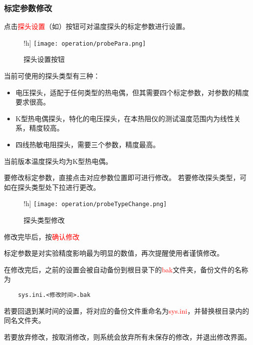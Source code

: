 \subsubsection*{标定参数修改}
点击\textcolor{red}{探头设置}（如）按钮可对温度探头的标定参数进行设置。
\begin{figure}!h]
    \centering
    \texttt{[image: operation/probePara.png]}
    \caption{  探头设置按钮 \label{fig:btnProbePara}}
\end{figure}
当前可使用的探头类型有三种：
\begin{itemize}
    \item 电压探头，适配于任何类型的热电偶，但其需要四个标定参数，对参数的精度要求很高。
    \item K型热电偶探头，特化的电压探头，在本热阻仪的测试温度范围内为线性关系，精度较高。
    \item 四线热敏电阻探头，需要三个参数，精度最高。
\end{itemize}
\begin{note}
    当前版本温度探头均为K型热电偶。
\end{note}
要修改标定参数，直接点击对应参数位置即可进行修改。
若要修改探头类型，可如在探头类型处下拉进行更改。
\begin{figure}!h]
    \centering
    \texttt{[image: operation/probeTypeChange.png]}
    \caption{  探头类型修改 \label{fig:probeTypeChange}}
\end{figure}
修改完毕后，按\textcolor{red}{确认修改}
\begin{note}
    标定参数是对实验精度影响最为明显的数值，再次提醒使用者谨慎修改。
\end{note}
在修改完后，之前的设置会被自动备份到根目录下的\textcolor{red}{bak}文件夹，备份文件的名称为
\begin{lstlisting}
    sys.ini.<修改时间>.bak
\end{lstlisting}
若要回退到某时间的设置，将对应的备份文件重命名为\textcolor{red}{sys.ini}，并替换根目录内的同名文件夹。
\par 若要放弃修改，按取消修改，则系统会放弃所有未保存的修改，并退出修改界面。
